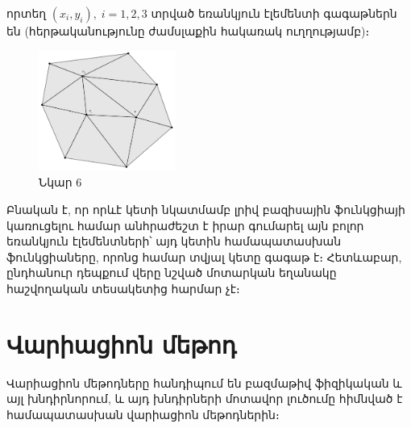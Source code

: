 \documentclass[fleqn, bachelor,subf,12pt,notitlepage]{disser}
\begin{document}
\noindent որտեղ $(x_{i}, y_{i}), \; i=1, 2, 3$ տրված եռանկյուն էլեմենտի գագաթներն են (հերթականությունը ժամսլաքին հակառակ ուղղությամբ)։

\begin{figure}[h!]
\centering
\includegraphics[width=0.4\textwidth]{images/image_7}
\captionsetup{labelformat=empty}
\caption{\hfill Նկար 6}
\end{figure}

\noindent Բնական է, որ որևէ կետի նկատմամբ լրիվ բազիսային ֆունկցիայի կառուցելու համար անհրաժեշտ է իրար գումարել այն բոլոր եռանկյուն էլեմենտների՝ այդ կետին համապատասխան ֆունկցիաները, որոնց համար տվյալ կետը գագաթ է։ Հետևաբար, ընդհանուր դեպքում վերը նշված մոտարկան եղանակը հաշվողական տեսակետից հարմար չէ։

\newpage
\section*{Վարիացիոն մեթոդ}

Վարիացիոն մեթոդները հանդիպում են բազմաթիվ ֆիզիկական և այլ խնդիրնորում, և այդ խնդիրների մոտավոր լուծումը հիմնված է համապատասխան վարիացիոն մեթոդներին։
\end{document}
